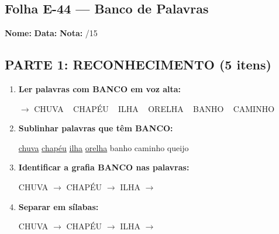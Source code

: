 \subsection{Folha E-44 --- Banco de Palavras}
\begin{exercicio}



\noindent\textbf{Nome:} \underline{\hspace{3.2cm}} \quad \textbf{Data:} \underline{\hspace{1.6cm}} \quad \textbf{Nota:} \underline{\hspace{0.9cm}}/15


\subsection*{PARTE 1: RECONHECIMENTO (5 itens)}

\begin{enumerate}

  \item \textbf{Ler palavras com BANCO em voz alta:}
  \begin{center}
  $\rightarrow$ CHUVA ~ CHAPÉU ~ ILHA ~ ORELHA ~ BANHO ~ CAMINHO
  \end{center}

  \item \textbf{Sublinhar palavras que têm BANCO:}

\begin{center}
  \uline{chuva} \quad \uline{chapéu} \quad \uline{ilha} \quad \uline{orelha} \quad banho \quad caminho \quad queijo
\end{center}

  \item \textbf{Identificar a grafia BANCO nas palavras:}
  \begin{center}
  CHUVA $\rightarrow$ \underline{\hspace{1cm}} \quad CHAPÉU $\rightarrow$ \underline{\hspace{1cm}} \quad ILHA $\rightarrow$ \underline{\hspace{1cm}}
  \end{center}

  \item \textbf{Separar em sílabas:}
  \begin{center}
  CHUVA $\rightarrow$ \underline{\hspace{1.2cm}} \quad CHAPÉU $\rightarrow$ \underline{\hspace{1.2cm}} \quad ILHA $\rightarrow$ \underline{\hspace{1.2cm}}
  \end{center}


\end{enumerate}
\end{exercicio}
